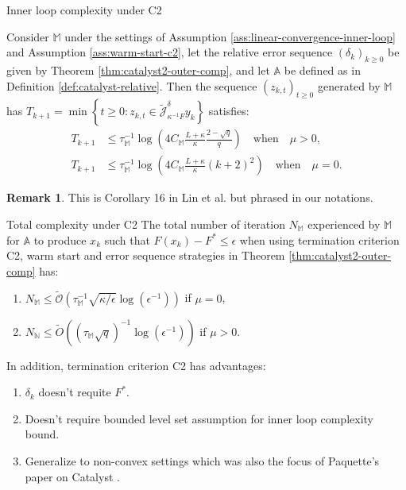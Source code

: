 \documentclass[11pt]{beamer}
\theoremstyle{definition}
\newtheorem{remark}{Remark}[section]
\begin{document}
        \begin{frame}{Inner loop complexity under C2}
            \begin{theorem}\label{thm:inner-loop-comp-c2}
                Consider $\mathbb M$ under the settings of Assumption \ref{ass:linear-convergence-inner-loop} and Assumption \ref{ass:warm-start-c2}, let the relative error sequence $(\delta_k)_{k \ge0}$ be given by Theorem \ref{thm:catalyst2-outer-comp}, and let $\mathbb A$ be defined as in Definition \ref{def:catalyst-relative}. 
                Then the sequence $(z_{k, t})_{t \ge 0}$ generated by $\mathbb M$ has $T_{k + 1} = \min\left\lbrace t \ge 0 : z_{k, t} \in \widetilde{\mathcal J}_{\kappa^{-1}F}^\delta y_k\right\rbrace$ satisfies: 
                \begin{align*}
                    T_{k + 1} &\le \tau_{\mathbb M}^{-1}
                    \log\left(
                        4 C_{\mathbb M}\frac{L + \kappa}{\kappa}\frac{2 - \sqrt{q}}{q}
                    \right) \quad \text{when}\quad \mu > 0, 
                    \\
                    T_{k + 1} &\le \tau_{\mathbb M}^{-1}
                    \log\left(
                        4 C_{\mathbb M}\frac{L + \kappa}{\kappa}(k + 2)^2
                    \right) \quad \text{when}\quad \mu = 0.  
                \end{align*}
            \end{theorem}
            \begin{remark}
                This is Corollary 16 in Lin et al. \cite{lin_catalyst_2018} but phrased in our notations. 
            \end{remark}
        \end{frame}
        \begin{frame}{Total complexity under C2}
            The total number of iteration $N_{\mathbb M}$ experienced by $\mathbb M$ for $\mathbb A$ to produce $x_k$ such that $F(x_k) - F^* \le \epsilon$ when using termination criterion C2, warm start and error sequence strategies in Theorem \ref{thm:catalyst2-outer-comp} has: 
            \begin{enumerate}
                \item $N_{\mathbb M} \le \widetilde{\mathcal O}\left(\tau_{\mathbb M}^{-1}\sqrt{\kappa/\epsilon}\log(\epsilon^{-1})\right)$ if $\mu = 0$, 
                \item $N_{\mathbb N}\le \widetilde{O}\left((\tau_{\mathbb M}\sqrt{q})^{-1}\log(\epsilon^{-1})\right)$ if $\mu > 0$. 
            \end{enumerate}
            In addition, termination criterion C2 has advantages: 
            \begin{enumerate}
                \item $\delta_k$ doesn't requite $F^*$. 
                \item Doesn't require bounded level set assumption for inner loop complexity bound. 
                \item Generalize to non-convex settings which was also the focus of Paquette's paper on Catalyst \cite{paquette_catalyst_2018}. 
            \end{enumerate}
        \end{frame}
\end{document}
